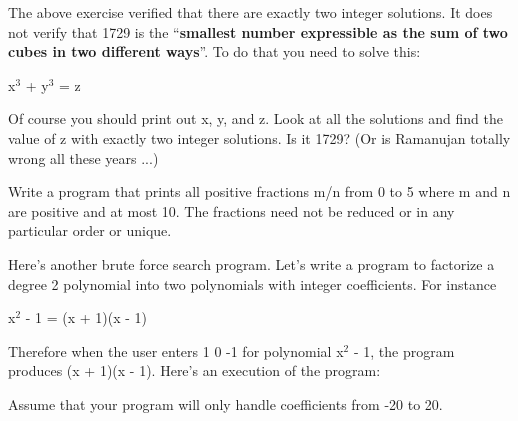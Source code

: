 \begin{console}
\begin{console}
\begin{ex} The above exercise verified that there are exactly
two integer solutions. It does not verify that 1729 is the
``\textbf{smallest number expressible as the sum of two cubes in two
different ways}''. To do that you need to solve this:
\begin{center}
x$^3$ + y$^3$ = z
\end{center}
Of course you should print out x, y, and z. Look at all the solutions
and find the value of z with exactly two integer solutions. Is it 1729?
(Or is Ramanujan totally wrong all these years ...)
\end{ex}
\begin{ex}
Write a program that prints all positive fractions m/n from 0
to 5 where m and n are positive and at most 10. The fractions need not
be reduced or in any particular order or unique.
\end{ex}

\newpage{}

Here's another brute force search program.
Let's write a program to factorize a degree 2 polynomial
into two polynomials with integer coefficients. For instance
\begin{center}
x$^2$ - 1 = (x + 1)(x - 1)
\end{center}
Therefore when the user enters 1 0 -1 for polynomial
x$^2$ - 1, the program produces (x + 1)(x - 1).
Here's an execution of the program:
Assume that your program will only handle coefficients from -20 to 20.


\end{console}
\end{console}
